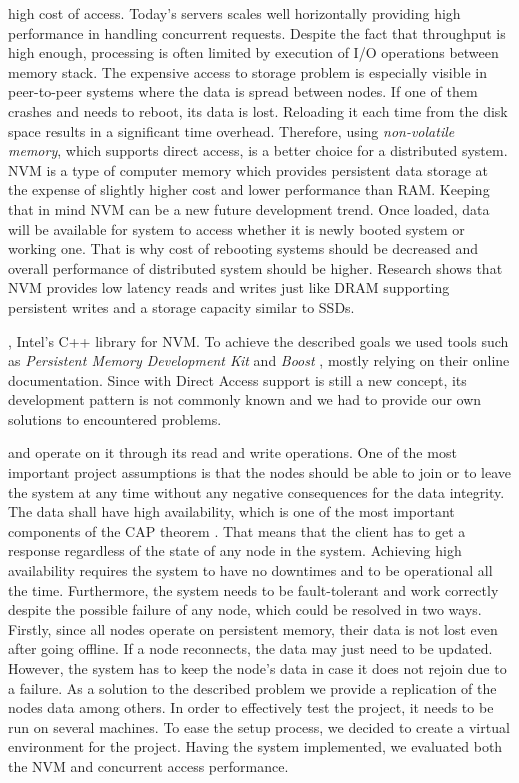 high cost of access.
Today's servers scales well horizontally providing high performance in handling concurrent requests.
Despite the fact that throughput is high enough, processing is often limited by execution of I/O operations between memory stack.
The expensive access to storage problem is especially visible in peer-to-peer systems where the data is spread between nodes. 
If one of them crashes and needs to reboot, its data is lost. 
Reloading it each time from the disk space results in a significant time overhead.
Therefore, using \textit{non-volatile memory}, which supports direct access, is a better choice for a distributed system.
NVM is a type of computer memory which provides persistent data storage at the expense of slightly higher cost and lower performance than RAM.
Keeping that in mind NVM can be a new future development trend.
Once loaded, data will be available for system to access whether it is newly booted system or working one.
That is why cost of rebooting systems should be decreased and overall performance of distributed system should be higher.
Research shows that NVM provides low latency reads and writes just like DRAM supporting persistent writes and a storage capacity similar to SSDs. \cite{NvmPerformanceArticle}





\libpmemobj, Intel's C++ library for NVM.
To achieve the described goals we used tools such as \textit{Persistent Memory Development Kit} \cite{PmemIo} and \textit{Boost} \cite{Asio}, mostly relying on their online documentation.
Since \NVM with Direct Access support is still a new concept, its development pattern is not commonly known and we had to provide our own solutions to encountered problems.

and operate on it through its read and write operations.
One of the most important project assumptions is that the nodes should be able to join or to leave the system at any time without any negative consequences for the data integrity.
The data shall have high availability, which is one of the most important components of the CAP theorem \cite{CAP}.
That means that the client has to get a response regardless of the state of any node in the system.
Achieving high availability requires the system to have no downtimes and to be operational all the time.
Furthermore, the system needs to be fault-tolerant and work correctly despite the possible failure of any node, which could be resolved in two ways.
Firstly, since all nodes operate on persistent memory, their data is not lost even after going offline. 
If a node reconnects, the data may just need to be updated. 
However, the system has to keep the node's data in case it does not rejoin due to a failure.
As a solution to the described problem we provide a replication of the nodes data among others.
In order to effectively test the project, it needs to be run on several machines. 
To ease the setup process, we decided to create a virtual environment for the project.
Having the system implemented, we evaluated both the NVM and concurrent access performance.

